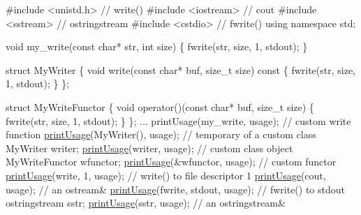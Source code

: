 \begin{DoxyCode}
\textcolor{preprocessor}{#include <unistd.h>}  \textcolor{comment}{// write()}
\textcolor{preprocessor}{#include <iostream>}  \textcolor{comment}{// cout}
\textcolor{preprocessor}{#include <sstream>}   \textcolor{comment}{// ostringstream}
\textcolor{preprocessor}{#include <cstdio>}    \textcolor{comment}{// fwrite()}
\textcolor{keyword}{using namespace }std;

\textcolor{keywordtype}{void} my\_write(\textcolor{keyword}{const} \textcolor{keywordtype}{char}* str, \textcolor{keywordtype}{int} size) \{
  fwrite(str, size, 1, stdout);
\}

\textcolor{keyword}{struct }MyWriter \{
  \textcolor{keywordtype}{void} write(\textcolor{keyword}{const} \textcolor{keywordtype}{char}* buf, \textcolor{keywordtype}{size\_t} size)\textcolor{keyword}{ const }\{
     fwrite(str, size, 1, stdout);
  \}
\};

\textcolor{keyword}{struct }MyWriteFunctor \{
  \textcolor{keywordtype}{void} operator()(\textcolor{keyword}{const} \textcolor{keywordtype}{char}* buf, \textcolor{keywordtype}{size\_t} size) \{
     fwrite(str, size, 1, stdout);
  \}
\};
...
printUsage(my\_write, usage);    \textcolor{comment}{// custom write function}
\hyperlink{namespace_option_parser_a2458d437c7f439220d0b3581a5db56b1}{printUsage}(MyWriter(), usage);  \textcolor{comment}{// temporary of a custom class}
MyWriter writer;
\hyperlink{namespace_option_parser_a2458d437c7f439220d0b3581a5db56b1}{printUsage}(writer, usage);      \textcolor{comment}{// custom class object}
MyWriteFunctor wfunctor;
\hyperlink{namespace_option_parser_a2458d437c7f439220d0b3581a5db56b1}{printUsage}(&wfunctor, usage);   \textcolor{comment}{// custom functor}
\hyperlink{namespace_option_parser_a2458d437c7f439220d0b3581a5db56b1}{printUsage}(write, 1, usage);    \textcolor{comment}{// write() to file descriptor 1}
\hyperlink{namespace_option_parser_a2458d437c7f439220d0b3581a5db56b1}{printUsage}(cout, usage);        \textcolor{comment}{// an ostream&}
\hyperlink{namespace_option_parser_a2458d437c7f439220d0b3581a5db56b1}{printUsage}(fwrite, stdout, usage);  \textcolor{comment}{// fwrite() to stdout}
ostringstream sstr;
\hyperlink{namespace_option_parser_a2458d437c7f439220d0b3581a5db56b1}{printUsage}(sstr, usage);        \textcolor{comment}{// an ostringstream&}
\end{DoxyCode}


